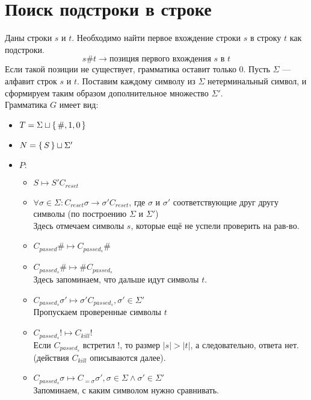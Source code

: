 \section{Поиск подстроки в строке}
Даны строки $s$ и $t$. Необходимо найти первое вхождение строки $s$ в строку $t$ как подстроки.
\[
    s\#t \rightarrow \text{позиция первого вхождения $s$ в $t$}
\]
Если такой позиции не существует, грамматика оставит только $0$. 
Пусть $\Sigma$ --- алфавит строк $s$ и $t$. Поставим каждому символу из $\Sigma$ нетерминальный символ, и сформируем таким образом дополнительное множество $\Sigma'$. \\

Грамматика $G$ имеет вид:
\begin{itemize}
    \item $T = \Sigma \sqcup \set{\#, 1, 0}$
    \item $N = \set{S} \sqcup \Sigma'$
    \item $P\colon$ \\
        \begin{itemize}
            \item $S \mapsto S'C_{reset}$ 
            \item $\forall \sigma \in \Sigma\colon C_{reset}\sigma \rightarrow \sigma'C_{reset}$, где $\sigma$ и $\sigma'$ соответствующие друг другу символы (по построению $\Sigma$ и $\Sigma'$) \\
                Здесь отмечаем символы $s$, которые ещё не успели проверить на рав-во.
            \item $C_{passed}\# \mapsto C_{passed_s}\#$
            \item $C_{passed_s}\# \mapsto \# C_{passed_s}$ \\
                Здесь запоминаем, что дальше идут символы $t$.
            \item $C_{passed_s}\sigma' \mapsto \sigma'C_{passed_s}, \sigma' \in \Sigma'$ \\
                Пропускаем проверенные символы $t$
            \item $C_{passed_s}! \mapsto C_{kill}!$ \\
                Если $C_{passed_s}$ встретил $!$, то размер $\left|s\right| > \left|t\right|$, а следовательно, ответа нет. (действия $C_{kill}$ описываются далее).
            \item $C_{passed_s}\sigma \mapsto C_{= \sigma} \sigma', \sigma \in \Sigma \land \sigma' \in \Sigma'$ \\
                Запоминаем, с каким символом нужно сравнивать.

\end{itemize}
\end{itemize}
